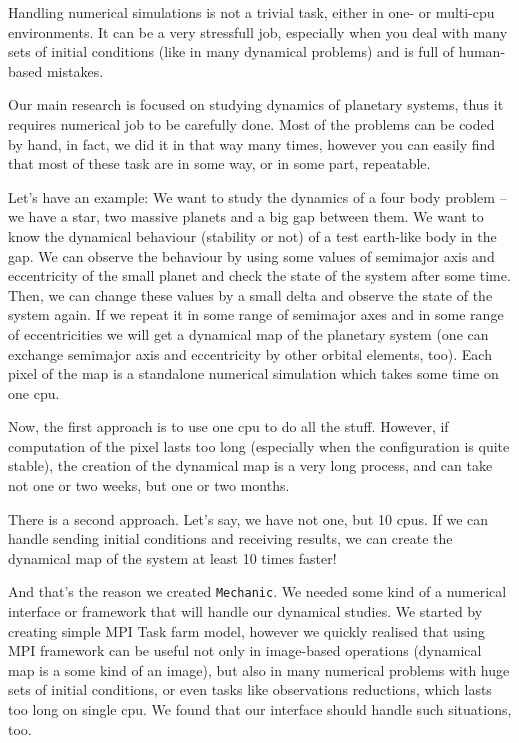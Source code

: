 Handling numerical simulations is not a trivial task, either in one- or multi-cpu environments. It can be a very stressfull job, especially when you deal with many sets of initial conditions (like in many dynamical problems) and is full of human-based mistakes.

Our main research is focused on studying dynamics of planetary systems, thus it requires numerical job to be carefully done. Most of the problems can be coded by hand, in fact, we did it in that way many times, however you can easily find that most of these task are in some way, or in some part, repeatable.

Let's have an example: We want to study the dynamics of a four body problem -- we have a star, two massive planets and a big gap between them. We want to know the dynamical behaviour (stability or not) of a test earth-like body in the gap. We can observe the behaviour by using some values of semimajor axis and eccentricity of the small planet and check the state of the system after some time. Then, we can change these values by a small delta and observe the state of the system again. If we repeat it in some range of semimajor axes and in some range of eccentricities we will get a dynamical map of the planetary system (one can exchange semimajor axis and eccentricity by other orbital elements, too). Each pixel of the map is a standalone numerical simulation which takes some time on one cpu.

Now, the first approach is to use one cpu to do all the stuff. However, if computation of the pixel lasts too long (especially when the configuration is quite stable), the creation of the dynamical map is a very long process, and can take not one or two weeks, but one or two months.

There is a second approach. Let's say, we have not one, but 10 cpus. If we can handle sending initial conditions and receiving results, we can create the dynamical map of the system at least 10 times faster!

And that's the reason we created {\tt Mechanic}. We needed some kind of a numerical interface or framework that will handle our dynamical studies. We started by creating simple MPI Task farm model, however we quickly realised that using MPI framework can be useful not only in image-based operations (dynamical map is a some kind of an image), but also in many numerical problems with huge sets of initial conditions, or even tasks like observations reductions, which lasts too long on single cpu. We found that our interface should handle such situations, too.

